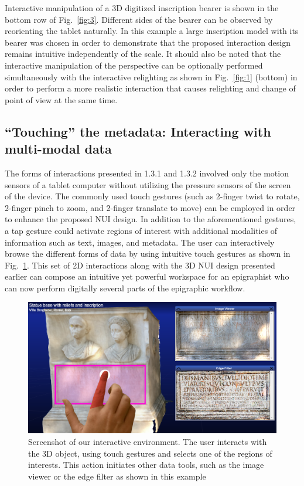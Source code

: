 \documentclass[amsthm,ebook]{saparticle}
\begin{document}
\newpage
Interactive manipulation of a 3D digitized inscription bearer is shown in the bottom row of Fig.~\ref{fig:3}. Different sides of
the bearer can be observed by reorienting the tablet naturally. In this example a large inscription model with its
bearer was chosen in order to demonstrate that the proposed interaction design remains intuitive independently of the
scale. It should also be noted that the interactive manipulation of the perspective can be optionally performed
simultaneously with the interactive relighting as shown in Fig.~\ref{fig:1} (bottom) in order to perform a more realistic
interaction that causes relighting and change of point of view at the same time. 


\subsection{``Touching'' the metadata: Interacting with multi-modal data}


\noindent The forms of interactions presented in 1.3.1 and 1.3.2 involved only the motion sensors of a tablet computer without
utilizing the pressure sensors of the screen of the device. The commonly used touch gestures (such as 2-finger twist to
rotate, 2-finger pinch to zoom, and 2-finger translate to move) can be employed in order to enhance the proposed NUI
design. In addition to the aforementioned gestures, a tap gesture could activate regions of interest with additional
modalities of information such as text, images, and metadata. The user can interactively browse the different forms of
data by using intuitive touch gestures as shown in Fig.~\ref{fig:4}. This set of 2D interactions along with the 3D NUI design
presented earlier can compose an intuitive yet powerful workspace for an epigraphist who can now perform digitally
several parts of the epigraphic workflow. 




\begin{figure}[!hbp]
\centering
 \includegraphics[width=\columnwidth]{EAGLE2016cameraready-img006.png}
\caption{Screenshot of our interactive environment. The user interacts with the 3D object, using touch gestures and
selects one of the regions of interests. This action initiates other data tools, such as the image viewer or the edge
filter as shown in this example}
\label{fig:4}
\end{figure}
\end{document}
